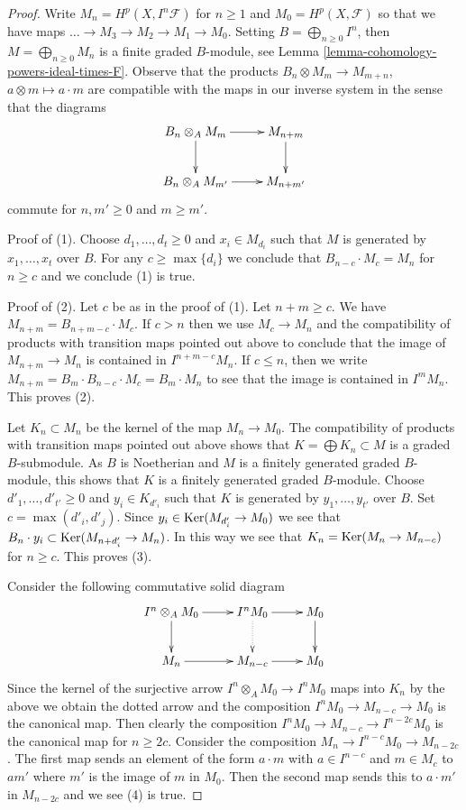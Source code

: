 \begin{proof}
Write $M_n = H^p(X, I^n\mathcal{F})$ for $n \geq 1$ and
$M_0 = H^p(X, \mathcal{F})$ so that we have maps
$\ldots \to M_3 \to M_2 \to M_1 \to M_0$. Setting
$B = \bigoplus_{n \geq 0} I^n$, then $M = \bigoplus_{n \geq 0} M_n$
is a finite graded $B$-module, see
Lemma \ref{lemma-cohomology-powers-ideal-times-F}.
Observe that the products
$B_n \otimes M_m \to M_{m + n}$, $a \otimes m \mapsto a \cdot m$
are compatible with the maps in our inverse system in the sense
that the diagrams
$$
\xymatrix{
B_n \otimes_A M_m \ar[r] \ar[d] & M_{n + m} \ar[d] \\
B_n \otimes_A M_{m'} \ar[r] & M_{n + m'}
}
$$
commute for $n, m' \geq 0$ and $m \geq m'$.

\medskip\noindent
Proof of (1). Choose $d_1, \ldots, d_t \geq 0$ and $x_i \in M_{d_i}$
such that $M$ is generated by $x_1, \ldots, x_t$ over $B$.
For any $c \geq \max\{d_i\}$ we conclude that
$B_{n - c} \cdot M_c = M_n$ for $n \geq c$ and we conclude (1) is true.

\medskip\noindent
Proof of (2). Let $c$ be as in the proof of (1). Let $n + m \geq c$.
We have $M_{n + m} = B_{n + m - c} \cdot M_c$.
If $c > n$ then we use $M_c \to M_n$ and the compatibility of products
with transition maps pointed out above to conclude that
the image of $M_{n + m} \to M_n$ is contained in $I^{n + m - c}M_n$.
If $c \leq n$, then we write $M_{n + m} = B_m \cdot B_{n - c} \cdot M_c =
B_m \cdot M_n$ to see that the image is contained in $I^m M_n$.
This proves (2).

\medskip\noindent
Let $K_n \subset M_n$ be the kernel of the map $M_n \to M_0$. The
compatibility of products with transition maps pointed out above
shows that $K = \bigoplus K_n \subset M$ is a graded $B$-submodule.
As $B$ is Noetherian and $M$ is a finitely generated graded $B$-module,
this shows that $K$ is a finitely generated graded $B$-module.
Choose $d'_1, \ldots, d'_{t'} \geq 0$ and $y_i \in K_{d'_i}$
such that $K$ is generated by $y_1, \ldots, y_{t'}$ over $B$.
Set $c = \max(d'_i, d'_j)$. Since $y_i \in \mathop{\mathrm{Ker}}(M_{d'_i} \to M_0)$
we see that $B_n \cdot y_i \subset \mathop{\mathrm{Ker}}(M_{n + d'_i} \to M_n)$.
In this way we see that $K_n = \mathop{\mathrm{Ker}}(M_n \to M_{n - c})$ for $n \geq c$.
This proves (3).

\medskip\noindent
Consider the following commutative solid diagram
$$
\xymatrix{
I^n \otimes_A M_0 \ar[r] \ar[d] &
I^nM_0 \ar[r] \ar@{..>}[d] &
M_0 \ar[d] \\
M_n \ar[r] &
M_{n - c} \ar[r] &
M_0
}
$$
Since the kernel of the surjective arrow $I^n \otimes_A M_0 \to I^nM_0$
maps into $K_n$ by the above we obtain the dotted arrow and the
composition $I^nM_0 \to M_{n - c} \to M_0$ is the canonical map.
Then clearly the composition $I^nM_0 \to M_{n - c} \to I^{n - 2c}M_0$
is the canonical map for $n \geq 2c$. Consider the composition
$M_n \to I^{n - c}M_0 \to M_{n - 2c}$. The first map
sends an element of the form $a \cdot m$
with $a \in I^{n - c}$ and $m \in M_c$
to $a m'$ where $m'$ is the image of $m$ in $M_0$.
Then the second map sends this to $a \cdot m'$ in $M_{n - 2c}$ and
we see (4) is true.


\end{proof}
